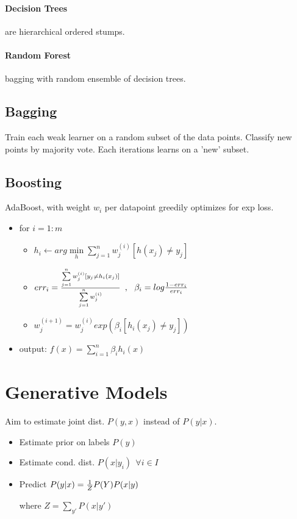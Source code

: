 \documentclass[11pt,twocolumn]{article}
\begin{document}
\paragraph{Decision Trees} are hierarchical ordered stumps.

\paragraph{Random Forest} bagging with random ensemble of decision trees.

\subsection{Bagging}
Train each weak learner on a random subset of the data points. Classify new points by majority vote. Each iterations learns on a 'new' subset.

\subsection{Boosting}

AdaBoost, with weight $w_i$ per datapoint greedily optimizes for exp loss.
\begin{itemize}[noitemsep,nolistsep]
\item for $i=1:m$
\begin{itemize}[noitemsep,nolistsep]
\item $h_i \leftarrow arg \min \limits_h \sum \limits_{j=1}^n  w_j^{(i)}[h(x_j) \neq y_j]$
\item $err_i = {{\sum \limits_{j=1}^n w_j^{(i)}[y_j \neq h_i(x_j)]}\over{\sum \limits_{j=1}^n w_j^{(i)}}} $
$,~~\beta_i = log {{1-err_i}\over{err_i}}$

\item $w_j^{(i+1)} = w_j^{(i)} exp(\beta_i [h_i(x_j) \neq y_j])$
\end{itemize}
\item output: $f(x) = \sum \limits_{i=1}^n \beta_i h_i (x)$
\end{itemize}


\section{Generative Models}

Aim to estimate joint dist. $P(y,x)$ instead of $P(y|x)$.

\begin{itemize}[noitemsep,nolistsep]
\item Estimate prior on labels $P(y)$
\item Estimate cond. dist. $P(x|y_i) ~~ \forall i \in I $
\item Predict $P(y|x) = {1 \over Z} P(Y)P(x|y)$ 

where $Z=\sum_{y'} P(x|y')$
\end{itemize}
\end{document}
